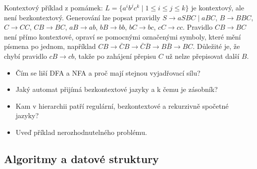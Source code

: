 \begin{odpoved}
Kontextový příklad z poznámek:
$L=\{a^ib^jc^k\mid 1\le i\le j\le k\}$ je kontextový, ale není bezkontextový.
Generování lze popsat pravidly $S\to aSBC\mid aBC$, $B\to BBC$, $C\to CC$,
$CB\to BC$, $aB\to ab$, $bB\to bb$, $bC\to bc$, $cC\to cc$. Pravidlo $CB\to BC$
není přímo kontextové, opraví se pomocnými označenými symboly, které mění písmena po
jednom, například $CB\to\bar C B\to\bar C\bar B\to B\bar B\to BC$. Důležité je, že
chybí pravidlo $cB\to cb$, takže po zahájení přepisu $C$ už nelze přepisovat další
$B$.
\end{odpoved}

\begin{recall}
\begin{itemize}[leftmargin=1.2em,itemsep=0pt,topsep=1pt]
  \item Čím se liší DFA a NFA a proč mají stejnou vyjadřovací sílu?
  \item Jaký automat přijímá bezkontextové jazyky a k čemu je zásobník?
  \item Kam v hierarchii patří regulární, bezkontextové a rekurzivně spočetné jazyky?
  \item Uveď příklad nerozhodnutelného problému.
\end{itemize}
\end{recall}

\subsection{Algoritmy a datové struktury}

